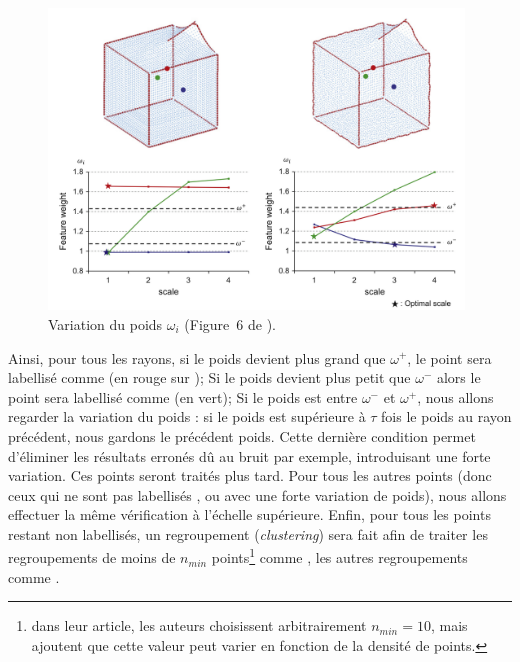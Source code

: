 \begin{figure}[ht]{
    \begin{center}
    \includegraphics[height=8cm]{images/Feature/Tensor_weight}
    \end{center}}
    \caption[Variation du poids $\omega_i$.]{Variation du poids $\omega_i$ (Figure~6 de \cite{Park2012}).
      \label{fig:tensor-weight}}
\end{figure}

Ainsi, pour tous les rayons, si le poids devient plus grand que $\omega^+$, le
point sera labellisé comme \Feature (en rouge sur
); Si le poids devient plus petit que
$\omega^-$ alors le point sera labellisé comme \NonFeature (en vert); Si le
poids est entre $\omega^-$ et $\omega^+$, nous allons regarder la variation du
poids : si le poids est supérieure à $\tau$ fois le poids au rayon précédent,
nous gardons le précédent poids. Cette dernière condition permet d'éliminer les
résultats erronés dû au bruit par exemple, introduisant une forte
variation. Ces points seront traités plus tard. Pour tous les autres points
(donc ceux qui ne sont pas labellisés \Feature, \NonFeature ou avec une forte
variation de poids), nous allons effectuer la même vérification à l'échelle
supérieure. Enfin, pour tous les points restant non labellisés, un regroupement
(\emph{clustering}) sera fait afin de traiter les regroupements de moins de
$n_{min}$ points\footnote{dans leur article, les auteurs choisissent
arbitrairement $n_{min}=10$, mais ajoutent que cette valeur peut varier en
fonction de la densité de points.} comme \NonFeature, les autres regroupements
comme \Feature.

